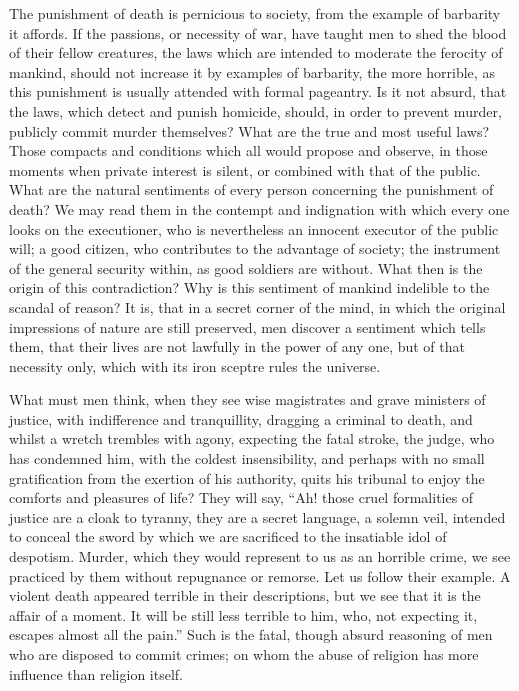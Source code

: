 The punishment of death is pernicious to society, from the example of
barbarity it affords. If the passions, or necessity of war, have
taught men to shed the blood of their fellow creatures, the laws which
are intended to moderate the ferocity of mankind, should not increase
it by examples  of barbarity, the more horrible, as this
punishment is usually attended with formal pageantry. Is it not
absurd, that the laws, which detect and punish homicide, should, in
order to prevent murder, publicly commit murder themselves? What are
the true and most useful laws? Those compacts and conditions which all
would propose and observe, in those moments when private interest is
silent, or combined with that of the public. What are the natural
sentiments of every person concerning the punishment of death? We may
read them in the contempt and indignation with which every one looks
on the executioner, who is nevertheless an innocent executor of the
public will; a good citizen, who contributes to the advantage of
society; the instrument of the general security within, as good
soldiers are without. What then is the origin of this contradiction?
Why is this sentiment of mankind indelible to the scandal of reason?
It is, that in a secret corner of the mind, in which the original
impressions of nature are still preserved, men discover a sentiment
which tells them, that their lives are not lawfully in the power of
any one, but of that necessity only, which with its iron sceptre rules
the universe.

What must men think, when they see wise  magistrates and
grave ministers of justice, with indifference and tranquillity,
dragging a criminal to death, and whilst a wretch trembles with agony,
expecting the fatal stroke, the judge, who has condemned him, with the
coldest insensibility, and perhaps with no small gratification from
the exertion of his authority, quits his tribunal to enjoy the
comforts and pleasures of life? They will say, ``Ah! those cruel
formalities of justice are a cloak to tyranny, they are a secret
language, a solemn veil, intended to conceal the sword by which we are
sacrificed to the insatiable idol of despotism. Murder, which they
would represent to us as an horrible crime, we see practiced by them
without repugnance or remorse. Let us follow their example. A violent
death appeared terrible in their descriptions, but we see that it is
the affair of a moment. It will be still less terrible to him, who,
not expecting it, escapes almost all the pain.'' Such is the fatal,
though absurd reasoning of men who are disposed to commit crimes; on
whom the abuse of religion has more influence than religion itself.

